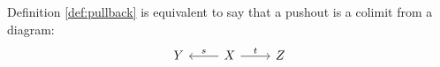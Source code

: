 \begin{definition}
  Definition \ref{def:pullback} is equivalent to say that a pushout is a colimit
  from a diagram:
  \[\begin{tikzcd}[ampersand replacement=\&]
    Y \& X \& Z
    \arrow["t", from=1-2, to=1-3]
    \arrow["s"', from=1-2, to=1-1]
  \end{tikzcd}\]
\end{definition}